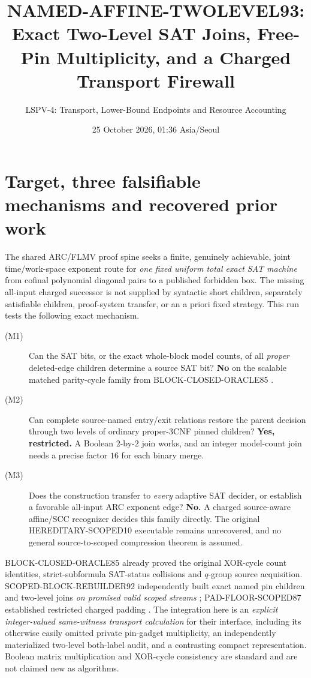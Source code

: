\documentclass[11pt]{article}
\title{NAMED-AFFINE-TWOLEVEL93:\\Exact Two-Level SAT Joins, Free-Pin Multiplicity, and a Charged Transport Firewall}
\author{LSPV-4: Transport, Lower-Bound Endpoints and Resource Accounting}
\date{25 October 2026, 01:36 Asia/Seoul}
\begin{document}
\maketitle
\begin{center}
\end{center}

\section{Target, three falsifiable mechanisms and recovered prior work}
The shared ARC/FLMV proof spine seeks a finite, genuinely achievable,
joint time/work-space exponent route for \emph{one fixed uniform total exact
SAT machine} from cofinal polynomial diagonal pairs to a published forbidden
box. The missing all-input charged successor is not supplied by syntactic
short children, separately satisfiable children, proof-system transfer, or
an a priori fixed strategy. This run tests the following exact mechanism.

\begin{description}
\item[(M1)] Can the SAT bits, or the exact whole-block model counts, of
all \emph{proper} deleted-edge children determine a source SAT bit?
\textbf{No} on the scalable matched parity-cycle family from
BLOCK-CLOSED-ORACLE85 \cite{block85}.
\item[(M2)] Can complete source-named entry/exit relations restore the
parent decision through two levels of ordinary proper-3CNF pinned children?
\textbf{Yes, restricted.} A Boolean $2$-by-$2$ join works, and an integer
model-count join needs a precise factor $16$ for each binary merge.
\item[(M3)] Does the construction transfer to \emph{every} adaptive SAT
decider, or establish a favorable all-input ARC exponent edge?
\textbf{No.} A charged source-aware affine/SCC recognizer decides this
family directly. The original HEREDITARY-SCOPED10 executable remains
unrecovered, and no general source-to-scoped compression theorem is assumed.
\end{description}

BLOCK-CLOSED-ORACLE85 already proved the original XOR-cycle count
identities, strict-subformula SAT-status collisions and $q$-group source
acquisition. SCOPED-BLOCK-REBUILDER92 independently built exact named
pin children and two-level joins \emph{on promised valid scoped streams}
\cite{scope92}; PAD-FLOOR-SCOPED87 established restricted charged padding
\cite{pad87}. The integration here is an \emph{explicit integer-valued
same-witness transport calculation} for their interface, including its
otherwise easily omitted private pin-gadget multiplicity, an independently
materialized two-level both-label audit, and a contrasting compact
representation. Boolean matrix multiplication and XOR-cycle consistency
are standard and are not claimed new as algorithms.
\end{document}
